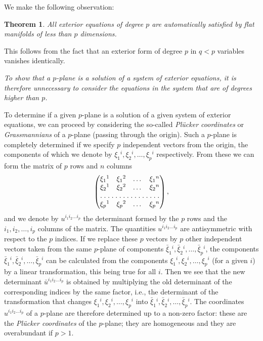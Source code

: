 \documentclass[leqno,11pt]{book}
\numberwithin{equation}{chapter}
\theoremstyle{shape1}
\newtheorem*{thm*}{\hspace{15pt}Theorem}
\theoremstyle{shape0}
\theoremstyle{shape2}
\theoremstyle{definition}
\begin{document}
We make the following observation:
\begin{thm*}
  All exterior equations of degree $p$ are automatically satisfied by flat manifolds of less than $p$ dimensions.
\end{thm*}

This follows from the fact that an exterior form of degree $p$ in $q<p$ variables vanishes identically.

\emph{To show that a $p$-plane is a solution of a system of exterior equations, it is therefore unnecessary to consider the equations in the system that are of degrees higher  than $p$.}

\vspace{12pt}\fsec To determine if a given $p$-plane is a solution of a given system of exterior equations, we can proceed by considering the so-called \emph{Pl\"ucker coordinates} or  \emph{Grassmannians} of a $p$-plane (passing through the origin). Such a $p$-plane is completely determined if we specify $p$ independent vectors from the origin, the components of which we denote by $\xi_{1}{}^{i},\xi_{2}{}^{i},\dots,\xi_{p}{}^{i}$ respectively. From these we can form the matrix of $p$ rows and $n$ columns
\[
\begin{pmatrix}
  \xi_{1}{}^{1}&\xi_{1}{}^{2}&\dots&\xi_{1}{}^{n}\\
  \xi_{2}{}^{1}&\xi_{2}{}^{2}&\dots&\xi_{2}{}^{n}\\
  \hdotsfor[1.5]{4}\\
  \xi_{p}{}^{1}&\xi_{p}{}^{2}&\dots&\xi_{p}{}^{n}\\
\end{pmatrix},
\]
and we denote by $u^{i_{1}i_{2}\dots i_{p}}$ the determinant formed by the $p$ rows and the $i_{1},i_{2},\dots,i_{p}$ columns of the matrix. The quantities $u^{i_{1}i_{2}\dots i_{p}}$ are antisymmetric with respect to the $p$ indices. If we replace these $p$ vectors by $p$ other independent vectors taken from the same $p$-plane of components $\bar\xi_{1}{}^{i},\bar\xi_{2}{}^{i},\dots,\bar\xi_{p}{}^{i}$, the components $\bar\xi_{1}{}^{i},\bar\xi_{2}{}^{i},\dots,\bar\xi_{p}{}^{i}$ can be calculated from the components $\xi_{1}{}^{i},\xi_{2}{}^{i},\dots,\xi_{p}{}^{i}$ (for a given $i$) by a linear transformation, this being true for all $i$. Then we see that the new determinant $\bar u^{i_{1}i_{2}\dots i_{p}}$ is obtained by multiplying the old determinant of the corresponding indices by the same factor, {i.e.}, the determinant of the transformation that changes $\xi_{1}{}^{i},\xi_{2}{}^{i},\dots,\xi_{p}{}^{i}$ into $\bar\xi_{1}{}^{i},\bar\xi_{2}{}^{i},\dots,\bar\xi_{p}{}^{i}$. The coordinates $u^{i_{1}i_{2}\dots i_{p}}$ of a $p$-plane are therefore determined up to a non-zero factor: these are  the \emph{Pl\"ucker coordinates} of the $p$-plane; they are homogeneous and they are overabundant if $p>1$.
\end{document}
